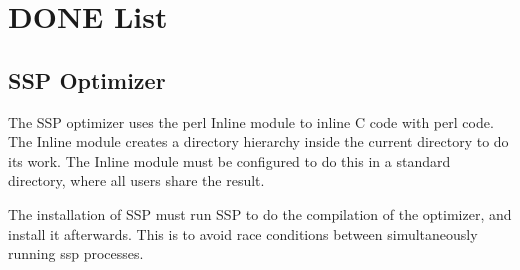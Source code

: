 \documentclass[12pt]{article}
\begin{document}
\section{DONE List}


\subsection{SSP Optimizer}

The SSP optimizer uses the perl Inline module to inline C code with
perl code.  The Inline module creates a directory hierarchy inside the
current directory to do its work.  The Inline module must be
configured to do this in a standard directory, where all users share
the result.

The installation of SSP must run SSP to do the compilation of the
optimizer, and install it afterwards.  This is to avoid race
conditions between simultaneously running ssp processes.
\end{document}
